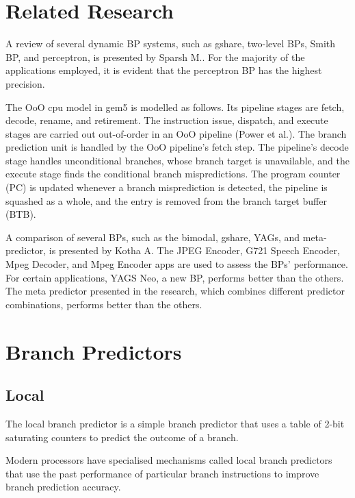 \documentclass[10pt,journal,compsoc]{IEEEtran}
\begin{document}
\section{Related Research}\label{related}

A review of several dynamic BP systems, such as gshare, two-level BPs, Smith BP, and perceptron, is presented by Sparsh M.\cite{mittalSurveyTechniquesDynamic2018}. 
For the majority of the applications employed, it is evident that the perceptron BP has the highest precision.

The OoO cpu model in gem5 is modelled as follows. Its pipeline stages are fetch, decode, rename, and retirement. 
The instruction issue, dispatch, and execute stages are carried out out-of-order in an OoO pipeline (Power et al.\cite{lowepower2020gem5simulatorversion200}). 
The branch prediction unit is handled by the OoO pipeline's fetch step. The pipeline's decode stage handles unconditional branches, whose branch target is unavailable, and the execute stage finds the conditional branch mispredictions. 
The program counter (PC) is updated whenever a branch misprediction is detected, the pipeline is squashed as a whole, and the entry is removed from the branch target buffer (BTB). 

A comparison of several BPs, such as the bimodal, gshare, YAGs, and meta-predictor, 
is presented by Kotha A\cite{kothaComparativeStudyBranch}. The JPEG Encoder, G721 Speech Encoder, Mpeg Decoder, and Mpeg 
Encoder apps are used to assess the BPs' performance. For certain applications, YAGS Neo, a new BP, 
performs better than the others. The meta predictor presented in the research, 
which combines different predictor combinations, performs better than the others.


\section{Branch Predictors}\label{branchPredictors}

\subsection{Local}
\noindent The local branch predictor is a simple branch predictor that uses a table of 2-bit saturating counters to predict the outcome of a branch.

Modern processors have specialised mechanisms called local branch predictors that use the past performance of particular branch instructions to improve branch prediction accuracy. 
\end{document}
